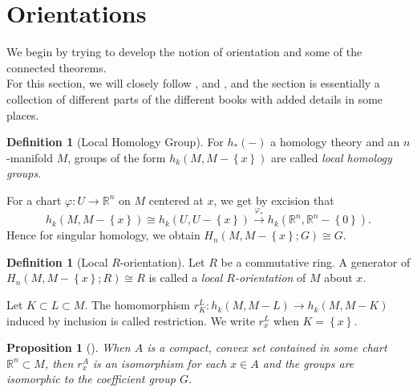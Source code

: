 \documentclass[reqno]{amsart}
\newtheorem{proposition}[theorem]{Proposition}
\theoremstyle{definition}
\newtheorem{definition}[theorem]{Definition}
\theoremstyle{remark}
\begin{document}
\section{Orientations}

We begin by trying to develop the notion of orientation and some of the
connected
theorems.\\
\linebreak
For this section, we will closely follow 
\cite{Bredon}, \cite{Dieck} and \cite{Dold}, and the section is
essentially a collection of different parts of the different books with
added details in some places.

\begin{definition}[Local Homology Group]
    For $h_*(-)$ a homology theory
    and an $n$-manifold $M$, groups of the form
    $h_k(M , M-\left\{ x \right\} )$ are called
    \textit{local homology groups}.
\end{definition}

For a chart $\varphi  \colon U \to \mathbb{R}^{n}$ 
on $M$ centered at $x$, we get by excision that
\[
h_k(M, M-\left\{ x \right\} ) 
\cong h_k\left( U, U- \left\{ x \right\}  \right) 
\stackrel{\varphi_*}{\to} h_k\left( \mathbb{R}^{n},
\mathbb{R}^{n} - \left\{ 0 \right\} \right) .
\] 
Hence for singular homology, we obtain
$H_n\left( M, M - \left\{ x \right\} ; G \right) 
\cong G$.


\begin{definition}[Local $R$-orientation]
    Let $R$ be a commutative ring.
    A generator of
    $H_n\left( M, M - \left\{ x \right\} ; R \right) 
    \cong R$ is called a 
    \textit{local $R$-orientation} of $M$ about $x$.
\end{definition}

Let $K \subset L \subset M$. The homomorphism
$r_{K}^{L} \colon h_k (M, M-L) \to 
h_k(M, M-K)$ induced by inclusion is
called restriction. We write
$r_{x}^{L}$ when $K = \left\{ x \right\} $.

\begin{proposition}[]\label{Prop:SIDJAV}
    When $A$ is a compact, convex set contained
    in some chart $\mathbb{R}^{n} \subset M$, then
    $r_{x}^{A}$ is an isomorphism for each
    $x \in A$ and the
    groups are isomorphic to the coefficient group
    $G$.
\end{proposition}
\end{document}
